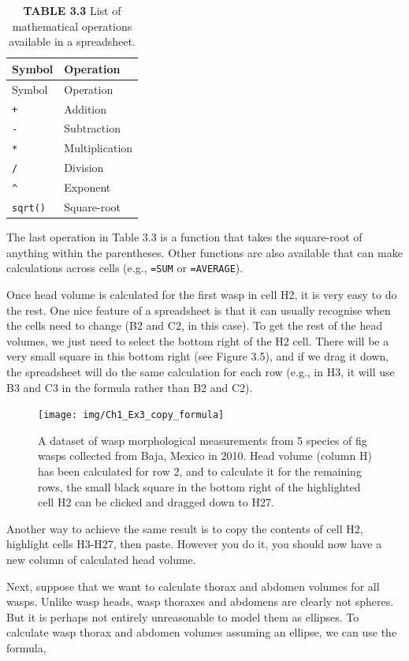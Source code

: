 \documentclass[
  openany]{krantz}
\begin{document}
\begin{longtable}[]{@{}ll@{}}
\caption{\textbf{TABLE 3.3} List of mathematical operations available in a spreadsheet.}\tabularnewline
\toprule
Symbol & Operation \\
\midrule
\endfirsthead
\toprule
Symbol & Operation \\
\midrule
\endhead
\texttt{+} & Addition \\
\texttt{-} & Subtraction \\
\texttt{*} & Multiplication \\
\texttt{/} & Division \\
\texttt{\^{}} & Exponent \\
\texttt{sqrt()} & Square-root \\
\bottomrule
\end{longtable}

The last operation in Table 3.3 is a function that takes the square-root of anything within the parentheses.
Other functions are also available that can make calculations across cells (e.g., \texttt{=SUM} or \texttt{=AVERAGE}).

Once head volume is calculated for the first wasp in cell H2, it is very easy to do the rest.
One nice feature of a spreadsheet is that it can usually recognise when the cells need to change (B2 and C2, in this case).
To get the rest of the head volumes, we just need to select the bottom right of the H2 cell.
There will be a very small square in this bottom right (see Figure 3.5), and if we drag it down, the spreadsheet will do the same calculation for each row (e.g., in H3, it will use B3 and C3 in the formula rather than B2 and C2).

\begin{figure}
\texttt{[image: img/Ch1\_Ex3\_copy\_formula]} \caption{A dataset of wasp morphological measurements from 5 species of fig wasps collected from Baja, Mexico in 2010. Head volume (column H) has been calculated for row 2, and to calculate it for the remaining rows, the small black square in the bottom right of the highlighted cell H2 can be clicked and dragged down to H27.}\label{fig:unnamed-chunk-20}
\end{figure}

Another way to achieve the same result is to copy the contents of cell H2, highlight cells H3-H27, then paste.
However you do it, you should now have a new column of calculated head volume.

Next, suppose that we want to calculate thorax and abdomen volumes for all wasps.
Unlike wasp heads, wasp thoraxes and abdomens are clearly not spheres.
But it is perhaps not entirely unreasonable to model them as ellipses.
To calculate wasp thorax and abdomen volumes assuming an ellipse, we can use the formula,
\end{document}
